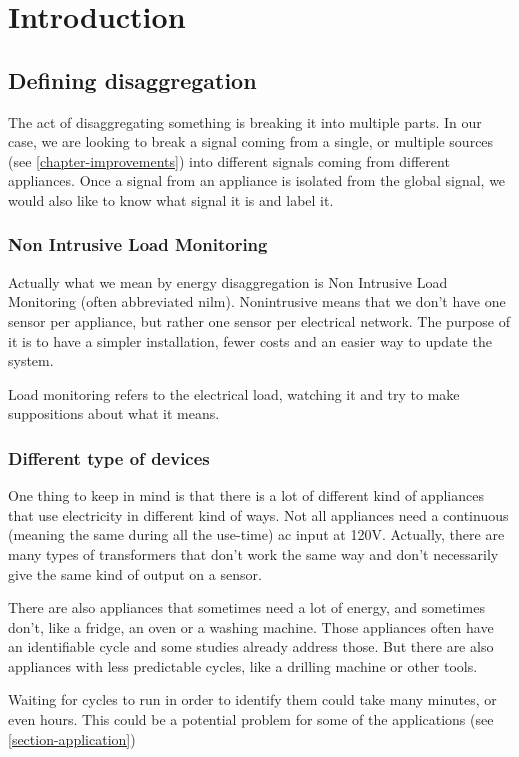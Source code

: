 \chapter{Introduction}
\section{Defining disaggregation}
The act of disaggregating something is breaking it into multiple parts. In our case, we are looking to break a signal coming from a single, or multiple sources (see \autoref{chapter-improvements}) into different signals coming from different appliances. Once a signal from an appliance is isolated from the global signal, we would also like to know what signal it is and label it.

\subsection{Non Intrusive Load Monitoring}
Actually what we mean by energy disaggregation is Non Intrusive Load Monitoring (often abbreviated \acrshort{nilm}). Nonintrusive means that we don't have one sensor per appliance, but rather one sensor per electrical network. The purpose of it is to have a simpler installation, fewer costs and an easier way to update the system.

Load monitoring refers to the electrical load, watching it and try to make suppositions about what it means.

\subsection{Different type of devices}
One thing to keep in mind is that there is a lot of different kind of appliances that use electricity in different kind of ways. Not all appliances need a continuous (meaning the same during all the use-time) \acrshort{ac} input at 120V. Actually, there are many types of transformers \cite{harlow2004electric} that don't work the same way and don't necessarily give the same kind of output on a sensor.

There are also appliances that sometimes need a lot of energy, and sometimes don't, like a fridge, an oven or a washing machine. Those appliances often have an identifiable cycle and some studies already address those. But there are also appliances with less predictable cycles, like a drilling machine or other tools.

Waiting for cycles to run in order to identify them could take many minutes, or even hours. This could be a potential problem for some of the applications (see \autoref{section-application})

